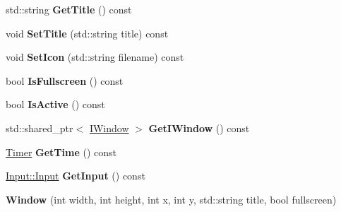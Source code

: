 \begin{DoxyCompactItemize}
\item 
\hypertarget{class_jade_1_1_system_1_1_window_a61e1612462c18be13dc3b2e1a01dfce5}{}std\+::string {\bfseries Get\+Title} () const \label{class_jade_1_1_system_1_1_window_a61e1612462c18be13dc3b2e1a01dfce5}

\item 
\hypertarget{class_jade_1_1_system_1_1_window_a275f84ab49b78f1ba46612447f5683e1}{}void {\bfseries Set\+Title} (std\+::string title) const \label{class_jade_1_1_system_1_1_window_a275f84ab49b78f1ba46612447f5683e1}

\item 
\hypertarget{class_jade_1_1_system_1_1_window_a0d6abe35b92fd2d2598919062b0e6b0c}{}void {\bfseries Set\+Icon} (std\+::string filename) const \label{class_jade_1_1_system_1_1_window_a0d6abe35b92fd2d2598919062b0e6b0c}

\item 
\hypertarget{class_jade_1_1_system_1_1_window_ae36b19e7f8e05bb0e1af58063e1f3f7b}{}bool {\bfseries Is\+Fullscreen} () const \label{class_jade_1_1_system_1_1_window_ae36b19e7f8e05bb0e1af58063e1f3f7b}

\item 
\hypertarget{class_jade_1_1_system_1_1_window_a1b05887e9ddd213ba43a16a4caf5d85f}{}bool {\bfseries Is\+Active} () const \label{class_jade_1_1_system_1_1_window_a1b05887e9ddd213ba43a16a4caf5d85f}

\item 
\hypertarget{class_jade_1_1_system_1_1_window_a092090dd6658c8edca8c9030d0c00490}{}std\+::shared\+\_\+ptr$<$ \hyperlink{struct_jade_1_1_system_1_1_i_window}{I\+Window} $>$ {\bfseries Get\+I\+Window} () const \label{class_jade_1_1_system_1_1_window_a092090dd6658c8edca8c9030d0c00490}

\item 
\hypertarget{class_jade_1_1_system_1_1_window_aff8a9ea34e259660afda6d1f3696434a}{}\hyperlink{class_jade_1_1_system_1_1_timer}{Timer} {\bfseries Get\+Time} () const \label{class_jade_1_1_system_1_1_window_aff8a9ea34e259660afda6d1f3696434a}

\item 
\hypertarget{class_jade_1_1_system_1_1_window_a9679baac6ae29568307624fb2dfcef3f}{}\hyperlink{struct_jade_1_1_input_1_1_input}{Input\+::\+Input} {\bfseries Get\+Input} () const \label{class_jade_1_1_system_1_1_window_a9679baac6ae29568307624fb2dfcef3f}

\item 
\hypertarget{class_jade_1_1_system_1_1_window_a7c43d89407ac25953bc0f73d34fffe33}{}{\bfseries Window} (int width, int height, int x, int y, std\+::string title, bool fullscreen)\label{class_jade_1_1_system_1_1_window_a7c43d89407ac25953bc0f73d34fffe33}


\end{DoxyCompactItemize}
